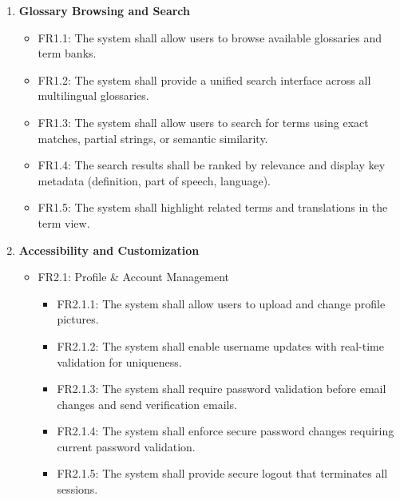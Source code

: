 \documentclass[12pt]{article}
\begin{document}
\begin{enumerate}[label=FR\arabic*:, leftmargin=2.5em]

    \item \textbf{Glossary Browsing and Search}
    \begin{itemize}
        \item FR1.1: The system shall allow users to browse available glossaries and term banks.
        \item FR1.2: The system shall provide a unified search interface across all multilingual glossaries.
        \item FR1.3: The system shall allow users to search for terms using exact matches, partial strings, or semantic similarity.
        \item FR1.4: The search results shall be ranked by relevance and display key metadata (definition, part of speech, language).
        \item FR1.5: The system shall highlight related terms and translations in the term view.
    \end{itemize}

    \item \textbf{Accessibility and Customization}
    \begin{itemize}
        \item FR2.1: Profile \& Account Management
        \begin{itemize}
            \item FR2.1.1: The system shall allow users to upload and change profile pictures.
            \item FR2.1.2: The system shall enable username updates with real-time validation for uniqueness.
            \item FR2.1.3: The system shall require password validation before email changes and send verification emails.
            \item FR2.1.4: The system shall enforce secure password changes requiring current password validation.
            \item FR2.1.5: The system shall provide secure logout that terminates all sessions.
        \end{itemize}
        

\end{itemize}
\end{enumerate}
\end{document}
